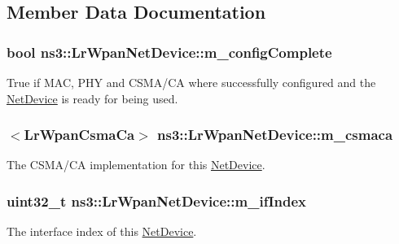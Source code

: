 \subsection{Member Data Documentation}
\subsubsection[{\texorpdfstring{m\+\_\+config\+Complete}{m_configComplete}}]{\setlength{\rightskip}{0pt plus 5cm}bool ns3\+::\+Lr\+Wpan\+Net\+Device\+::m\+\_\+config\+Complete\hspace{0.3cm}{\ttfamily [private]}}\hypertarget{classns3_1_1LrWpanNetDevice_ac13281dadc488033dcdef806c30c76b9}{}\label{classns3_1_1LrWpanNetDevice_ac13281dadc488033dcdef806c30c76b9}
True if M\+AC, P\+HY and C\+S\+M\+A/\+CA where successfully configured and the \hyperlink{classns3_1_1NetDevice}{Net\+Device} is ready for being used. 
\subsubsection[{\texorpdfstring{m\+\_\+csmaca}{m_csmaca}}]{$<${\bf Lr\+Wpan\+Csma\+Ca}$>$ ns3\+::\+Lr\+Wpan\+Net\+Device\+::m\+\_\+csmaca\hspace{0.3cm}{\ttfamily [private]}}\hypertarget{classns3_1_1LrWpanNetDevice_adf20b42f2fc813649c641cdd3d90e046}{}\label{classns3_1_1LrWpanNetDevice_adf20b42f2fc813649c641cdd3d90e046}
The C\+S\+M\+A/\+CA implementation for this \hyperlink{classns3_1_1NetDevice}{Net\+Device}. 
\subsubsection[{\texorpdfstring{m\+\_\+if\+Index}{m_ifIndex}}]{\setlength{\rightskip}{0pt plus 5cm}uint32\+\_\+t ns3\+::\+Lr\+Wpan\+Net\+Device\+::m\+\_\+if\+Index\hspace{0.3cm}{\ttfamily [private]}}\hypertarget{classns3_1_1LrWpanNetDevice_aff87fd6bdcb758c002c4bc05497f3fcd}{}\label{classns3_1_1LrWpanNetDevice_aff87fd6bdcb758c002c4bc05497f3fcd}
The interface index of this \hyperlink{classns3_1_1NetDevice}{Net\+Device}. 
